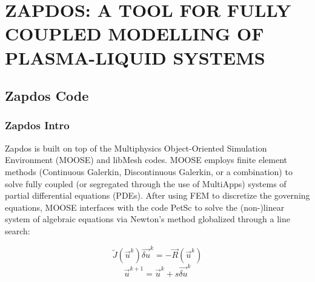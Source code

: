 \chapter{ZAPDOS: A TOOL FOR FULLY COUPLED MODELLING OF PLASMA-LIQUID SYSTEMS}
\label{chap:zapdos}

\section{Zapdos Code}
\label{sec:zapdos}

\subsection{Zapdos Intro}
\label{sec:zapdos_intro}

Zapdos is built on top of the Multiphysics Object-Oriented Simulation Environment (MOOSE) \cite{mooseSite} and libMesh \cite{libmeshSite} codes. MOOSE employs finite element methods (Continuous Galerkin, Discontinuous Galerkin, or a combination) to solve fully coupled (or segregated through the use of MultiApps) systems of partial differential equations (PDEs). After using FEM to discretize the governing equations, MOOSE interfaces with the code PetSc \cite{petscSite} to solve the (non-)linear system of algebraic equations via Newton's method globalized through a line search:

\begin{equation}
  \tilde{J}(\vec{u}^k)\vec{\delta u}^k = -\vec{R}(\vec{u}^k)
  \label{eq:Newton}
\end{equation}
\begin{equation}
  \vec{u}^{k+1} = \vec{u}^k + s\vec{\delta u}^k
  \label{eq:line_search}
\end{equation}

